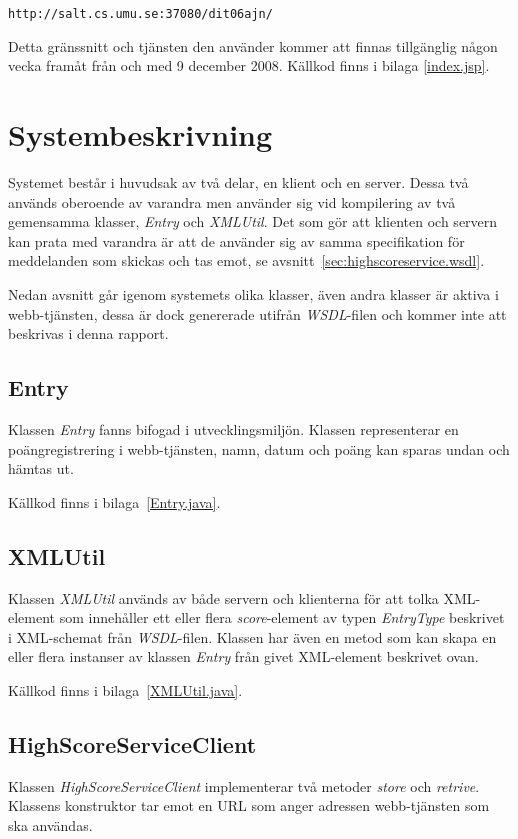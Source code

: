 \documentclass[a4paper, 12pt]{article}
\begin{document}
\begin{footnotesize}
\verb!http://salt.cs.umu.se:37080/dit06ajn/!
\end{footnotesize}

Detta gränssnitt och tjänsten den använder kommer att finnas
tillgänglig någon vecka framåt från och med 9 december 2008. Källkod
finns i bilaga \ref{index.jsp}.

\section{Systembeskrivning}\label{Systembeskrivning}

Systemet består i huvudsak av två delar, en klient och en
server. Dessa två används oberoende av varandra men använder sig vid
kompilering av två gemensamma klasser, \textit{Entry} och
\textit{XMLUtil}. Det som gör att klienten och servern kan prata med
varandra är att de använder sig av samma specifikation för meddelanden
som skickas och tas emot, se avsnitt~\ref{sec:highscoreservice.wsdl}.

Nedan avsnitt går igenom systemets olika klasser, även andra klasser
är aktiva i webb-tjänsten, dessa är dock genererade utifrån
\textit{WSDL}-filen och kommer inte att beskrivas i denna rapport.

\subsection{Entry}
Klassen \textit{Entry} fanns bifogad i utvecklingsmiljön. Klassen
representerar en poängregistrering i webb-tjänsten, namn, datum och
poäng kan sparas undan och hämtas ut.

Källkod finns i bilaga~\ref{Entry.java}.

\subsection{XMLUtil}
Klassen \textit{XMLUtil} används av både servern och klienterna för
att tolka XML-element som innehåller ett eller flera
\textit{score}-element av typen \textit{EntryType} beskrivet i
XML-schemat från \textit{WSDL}-filen. Klassen har även en metod som
kan skapa en eller flera instanser av klassen \textit{Entry} från
givet XML-element beskrivet ovan.

Källkod finns i bilaga~\ref{XMLUtil.java}.

\subsection{HighScoreServiceClient}
Klassen \textit{HighScoreServiceClient} implementerar två metoder
\textit{store} och \textit{retrive}. Klassens konstruktor tar emot en
URL som anger adressen webb-tjänsten som ska användas.
\end{document}

